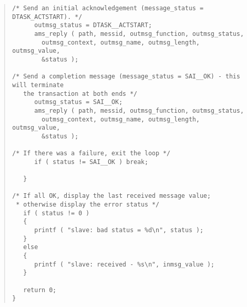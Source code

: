 \documentclass[twoside,11pt]{article}
\renewcommand{\_}{\texttt{\symbol{95}}}
\begin{document}
\begin{small}
\begin{quote}
\begin{verbatim}
/* Send an initial acknowledgement (message_status = DTASK_ACTSTART). */
      outmsg_status = DTASK__ACTSTART;
      ams_reply ( path, messid, outmsg_function, outmsg_status, 
        outmsg_context, outmsg_name, outmsg_length, outmsg_value, 
        &status ); 

/* Send a completion message (message_status = SAI__OK) - this will terminate
   the transaction at both ends */
      outmsg_status = SAI__OK;
      ams_reply ( path, messid, outmsg_function, outmsg_status, 
        outmsg_context, outmsg_name, outmsg_length, outmsg_value, 
        &status ); 

/* If there was a failure, exit the loop */
      if ( status != SAI__OK ) break;

   }

/* If all OK, display the last received message value;
 * otherwise display the error status */
   if ( status != 0 )
   {
      printf ( "slave: bad status = %d\n", status );
   }
   else
   {
      printf ( "slave: received - %s\n", inmsg_value );
   }

   return 0;
}
\end{verbatim}
\end{quote}
\end{small}
\newpage
\end{document}
